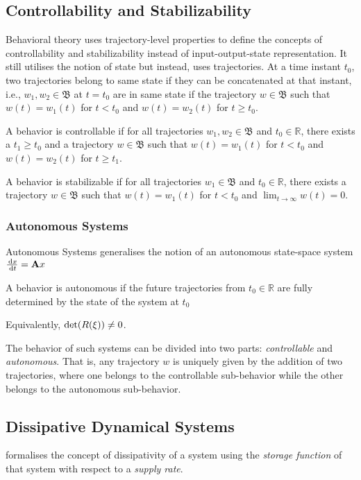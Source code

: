 \subsection{Controllability and Stabilizability}
Behavioral theory uses trajectory-level properties to define the concepts of controllability and stabilizability instead of input-output-state representation. It still utilises the notion of state but instead, uses trajectories. At a time instant $t_0$, two trajectories belong to same state if they can be concatenated at that instant, i.e., $w_1, w_2 \in \mathfrak{B}$ at $t=t_0$ are in same state if the trajectory $w \in\mathfrak{B}$ such that $w(t)=w_1(t)$ for $t<t_0$ and $w(t)=w_2(t)$ for $t\geq t_0$.
\begin{definition}
A behavior is controllable if for all trajectories $w_1, w_2 \in \mathfrak{B}$ and $t_0\in \mathbb{R}$, there exists a $t_1\geq t_0$ and a trajectory $w\in \mathfrak{B}$ such that $w(t)=w_1(t)$ for $t<t_0$ and $w(t)=w_2(t)$ for $t\geq t_1$.
\end{definition}
\begin{definition}
A behavior is stabilizable if for all trajectories $w_1 \in \mathfrak{B}$ and $t_0\in \mathbb{R}$, there exists a trajectory $w\in \mathfrak{B}$ such that $w(t)=w_1(t)$ for $t<t_0$ and $\lim_{t\rightarrow\infty}w(t)=0$.
\end{definition}
\subsubsection{Autonomous Systems}
Autonomous Systems generalises the notion of an autonomous state-space system $\frac{\, \mathrm{d} x}{\, \mathrm{d} t}=\mathbf{A} x$
\begin{definition}
A behavior is autonomous if the future trajectories from $t_0\in \mathbb{R}$ are fully determined by the state of the system at $t_0$
\end{definition}
Equivalently, $\operatorname{det}(R(\xi))\neq0$.

The behavior of such systems can be divided into two parts: \emph{controllable} and \emph{autonomous}. That is, any trajectory $w$ is uniquely given by the addition of two trajectories, where one belongs to the controllable sub-behavior while the other belongs to the autonomous sub-behavior.
\subsection{Dissipative Dynamical Systems}\label{eq:dds}
\cite{Willems1972DissipativeDS, Willems1972DissipativeDS2} formalises the concept of dissipativity of a system using the \emph{storage function} of that system with respect to a \emph{supply rate}.
